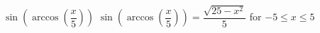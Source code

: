  {$\sin\left(\arccos\left(\dfrac{x}{5}\right)\right)$}
{ $\sin\left(\arccos\left(\dfrac{x}{5}\right)\right) = \dfrac{\sqrt{25-x^2}}{5}$ for $-5 \leq x \leq 5$}

